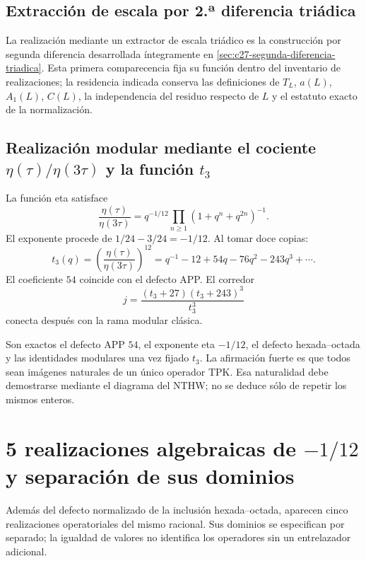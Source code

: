 \subsection{Extracción de escala por 2.ª diferencia triádica}

La realización mediante un extractor de escala triádico es la construcción por
segunda diferencia desarrollada íntegramente en
\cref{sec:c27-segunda-diferencia-triadica}. Esta primera comparecencia fija su
función dentro del inventario de realizaciones; la residencia indicada conserva
las definiciones de \(T_L\), \(a(L)\), \(A_1(L)\), \(C(L)\), la independencia
del residuo respecto de \(L\) y el estatuto exacto de la normalización.

\subsection{Realización modular mediante el cociente \(\eta(\tau)/\eta(3\tau)\) y la función \(t_3\)}

La función eta satisface
\[
\frac{\eta(\tau)}{\eta(3\tau)}
=q^{-1/12}\prod_{n\ge1}(1+q^n+q^{2n})^{-1}.
\]
El exponente procede de \(1/24-3/24=-1/12\). Al tomar doce copias:
\[
t_3(q)=\left(\frac{\eta(\tau)}{\eta(3\tau)}\right)^{12}
=q^{-1}-12+54q-76q^2-243q^3+\cdots.
\]
El coeficiente \(54\) coincide con el defecto APP. El corredor
\[
j=\frac{(t_3+27)(t_3+243)^3}{t_3^3}
\]
conecta después con la rama modular clásica.

\begin{remark}
Son exactos el defecto APP \(54\), el exponente eta \(-1/12\), el defecto
hexada--octada y las identidades modulares una vez fijado \(t_3\). La
afirmación fuerte es que todos sean imágenes naturales de un único operador
TPK. Esa naturalidad debe demostrarse mediante el diagrama del NTHW; no se
deduce sólo de repetir los mismos enteros.
\end{remark}


\section{5 realizaciones algebraicas de \texorpdfstring{\(-1/12\)}{-1/12} y separación de sus dominios}

Además del defecto normalizado de la inclusión hexada--octada, aparecen
cinco realizaciones operatoriales del mismo racional. Sus dominios se
especifican por separado; la igualdad de valores no identifica los
operadores sin un entrelazador adicional.

